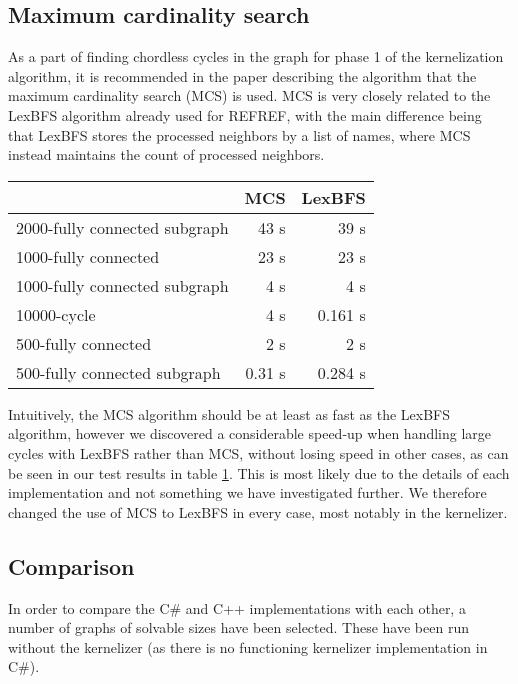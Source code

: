 \documentclass{article}
\begin{document}
		\subsection{Maximum cardinality search}
		\label{subsec:maximum-cardinality-search}
		As a part of finding chordless cycles in the graph for phase 1 of the kernelization algorithm, it is recommended in the paper describing the algorithm\cite{kernel} that the maximum cardinality search (MCS) is used.
		MCS is very closely related to the LexBFS algorithm already used for REFREF, with the main difference being that LexBFS stores the processed neighbors by a list of names, where MCS instead maintains the count of processed neighbors.

		\begin{table}[!ht]
			\begin{tabular}{| l | r | r |}
			\hline
											& MCS 		& LexBFS 	\\ \hline
			2000-fully connected subgraph	& 43 s  	& 39 s 		\\ \hline
			1000-fully connected 			& 23 s 		& 23 s 		\\ \hline
			1000-fully connected subgraph	& 4 s   	& 4 s 		\\ \hline
			10000-cycle 					& 4 s   	& 0.161 s 	\\ \hline 
			500-fully connected 			& 2 s   	& 2 s 		\\ \hline 
			500-fully connected subgraph 	& 0.31 s 	& 0.284 s 	\\ \hline 
			\end{tabular}
			\label{table:maximum-cardinality-search}
		\end{table}
		Intuitively, the MCS algorithm should be at least as fast as the LexBFS algorithm, however we discovered a considerable speed-up when handling large cycles with LexBFS rather than MCS, without losing speed in other cases, as can be seen in our test results in table \ref{table:maximum-cardinality-search}.
		This is most likely due to the details of each implementation and not something we have investigated further.
		We therefore changed the use of MCS to LexBFS in every case, most notably in the kernelizer.

		\subsection{Comparison}
		In order to compare the C\# and C++ implementations with each other, a number of graphs of solvable sizes have been selected.
		These have been run without the kernelizer (as there is no functioning kernelizer implementation in C\#).
\end{document}

